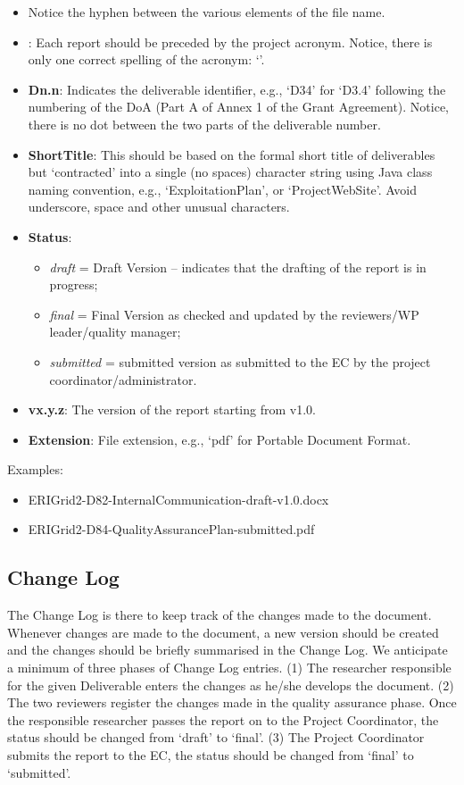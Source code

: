 \begin{itemize}
	\item Notice the hyphen between the various elements of the file name.
    \item {\bf \projacronym}: Each \projacronym{} report should be preceded by the project acronym. Notice, there is only one correct spelling of the acronym: ‘\projacronym’. 
    \item {\bf Dn.n}: Indicates the deliverable identifier, e.g., ‘D34’ for ‘D3.4’ following the numbering of the \ac{DoA} (Part A of Annex 1 of the Grant Agreement). Notice, there is no dot between the two parts of the deliverable number.
    \item {\bf ShortTitle}: This should be based on the formal short title of deliverables but ‘contracted’ into a single (no spaces) character string using Java class naming convention, e.g., ‘ExploitationPlan’,  or ‘ProjectWebSite’. Avoid underscore, space and other unusual characters.
	\item {\bf Status}: 
	\begin{itemize}
		\item \textit{draft} = Draft Version – indicates that the drafting of the report is in progress; 
		\item \textit{final} = Final Version as checked and updated by the reviewers/WP leader/quality manager; 
		\item \textit{submitted} = submitted version as submitted to the EC by the project coordinator/administrator.
	\end{itemize}
	\item {\bf vx.y.z}: The version of the report starting from v1.0. 
    \item {\bf Extension}: File extension, e.g., ‘pdf’ for Portable Document Format. 
\end{itemize}

Examples:

\begin{itemize}
    \item ERIGrid2-D82-InternalCommunication-draft-v1.0.docx
    \item ERIGrid2-D84-QualityAssurancePlan-submitted.pdf
\end{itemize}

\subsection{Change Log}
\label{sec:change-log}

The Change Log is there to keep track of the changes made to the document. Whenever changes are made to the document, a new version should be created and the changes should be briefly summarised in the Change Log. We anticipate a minimum of three phases of Change Log entries. (1) The researcher responsible for the given Deliverable enters the changes as he/she develops the document. (2) The two reviewers register the changes made in the quality assurance phase. Once the responsible researcher passes the report on to the Project Coordinator, the status should be changed from ‘draft’ to ‘final’. (3) The Project Coordinator submits the report to the EC, the status should be changed from ‘final’ to ‘submitted’.

